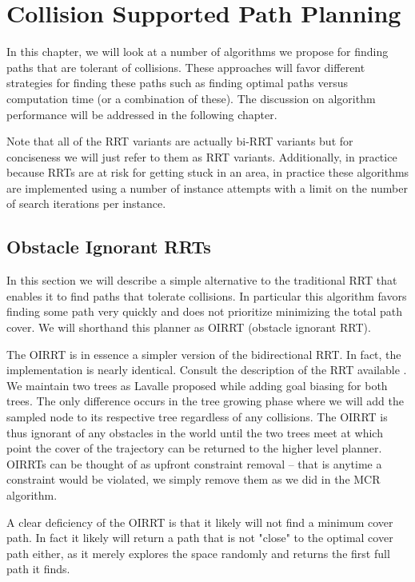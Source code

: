 \chapter{Collision Supported Path Planning}
In this chapter, we will look at a number of algorithms we propose for finding paths that are tolerant of collisions. These approaches will favor different strategies for finding these paths such as finding optimal paths versus computation time (or a combination of these). The discussion on algorithm performance will be addressed in the following chapter.

Note that all of the RRT variants are actually bi-RRT variants but for conciseness we will just refer to them as RRT variants. Additionally, in practice because RRTs are at risk for getting stuck in an area, in practice these algorithms are implemented using a number of instance attempts with a limit on the number of search iterations per instance.

\section{Obstacle Ignorant RRTs}
In this section we will describe a simple alternative to the traditional RRT that enables it to find paths that tolerate collisions. In particular this algorithm favors finding some path very quickly and does not prioritize minimizing the total path cover. We will shorthand this planner as OIRRT (obstacle ignorant RRT).

The OIRRT is in essence a simpler version of the bidirectional RRT. In fact, the implementation is nearly identical. Consult the description of the RRT available . We maintain two trees as Lavalle proposed while adding goal biasing for both trees. The only difference occurs in the tree growing phase where we will add the sampled node to its respective tree regardless of any collisions. The OIRRT is thus ignorant of any obstacles in the world until the two trees meet at which point the cover of the trajectory can be returned to the higher level planner. OIRRTs can be thought of as upfront constraint removal -- that is anytime a constraint would be violated, we simply remove them as we did in the MCR algorithm. 

A clear deficiency of the OIRRT is that it likely will not find a minimum cover path. In fact it likely will return a path that is not "close" to the optimal cover path either, as it merely explores the space randomly and returns the first full path it finds.

